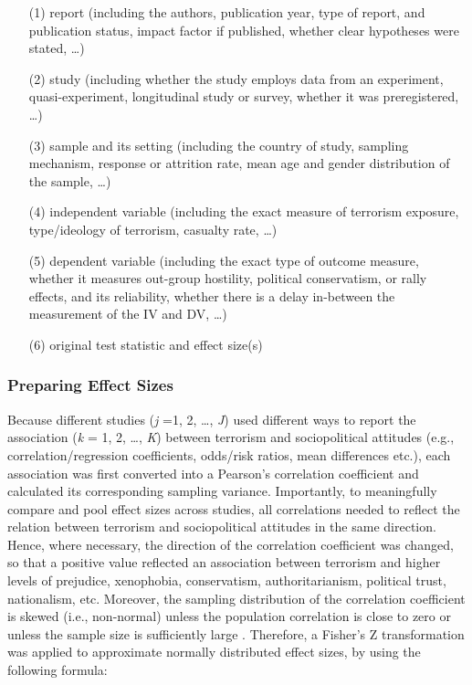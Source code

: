 \begin{enumerate}[noitemsep]
    \item[(1)] report (including the authors, publication year, type of report, and publication status, impact factor if published, whether clear hypotheses were stated, \dots)
    \item[(2)] study (including whether the study employs data from an experiment, quasi-experiment, longitudinal study or survey, whether it was preregistered, \dots)
    \item[(3)] sample and its setting (including the country of study, sampling mechanism, response or attrition rate, mean age and gender distribution of the sample, \dots)
    \item[(4)] independent variable (including the exact measure of terrorism exposure, type/ideology of terrorism, casualty rate, \dots) 
    \item[(5)] dependent variable (including the exact type of outcome measure, whether it measures out-group hostility, political conservatism, or rally effects, and its reliability, whether there is a delay in-between the measurement of the IV and DV, \dots)
    \item[(6)] original test statistic and effect size(s)
\end{enumerate}


\subsubsection{Preparing Effect Sizes}
Because different studies (\textit{j} =1, 2, \dots, \textit{J}) used different ways to report the association (\textit{k} = 1, 2, \dots, \textit{K}) between terrorism and sociopolitical attitudes (e.g., correlation/regression coefficients, odds/risk ratios, mean differences etc.), each association was first converted into a Pearson’s correlation coefficient and calculated its corresponding sampling variance. Importantly, to meaningfully compare and pool effect sizes across studies, all correlations needed to reflect the relation between terrorism and sociopolitical attitudes in the same direction. Hence, where necessary, the direction of the correlation coefficient was changed, so that a positive value reflected an association between terrorism and higher levels of prejudice, xenophobia, conservatism, authoritarianism, political trust, nationalism, etc. Moreover, the sampling distribution of the correlation coefficient is skewed (i.e., non-normal) unless the population correlation is close to zero or unless the sample size is sufficiently large \citep{Cheung2015}. Therefore, a Fisher’s Z transformation was applied to approximate normally distributed effect sizes, by using the following formula:


